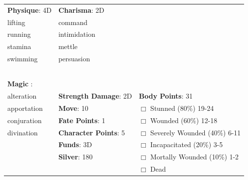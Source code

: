 \documentclass[10pt]{article}
\begin{document}
\begin{table}
\begin{tabular}{m{156pt} m{156pt} m{156pt}}
\textbf{Physique}: 4D \hrulefill & \textbf{Charisma}: 2D \hrulefill     &  \hrulefill \\

lifting              \hrulefill & command              \hrulefill &  \hrulefill \\

running              \hrulefill & intimidation         \hrulefill &  \hrulefill \\

stamina              \hrulefill & mettle               \hrulefill &  \hrulefill \\

swimming             \hrulefill & persuasion           \hrulefill &  \hrulefill \\

 \hrulefill &  \hrulefill &  \hrulefill \\

 \hrulefill &  \hrulefill &  \hrulefill \\

 \hrulefill &  \hrulefill &  \hrulefill \\

 \hrulefill &  \hrulefill &  \hrulefill \\

                                  &                                 &                             \\
\textbf{Magic }:  \hrulefill  &                                 &                             \\
alteration           \hrulefill & \textbf{Strength Damage}: 2D \hrulefill                             & \textbf{Body Points}: 31 \hrulefill \\
apportation          \hrulefill                        & \textbf{Move}:             10             \hrulefill    & $\Box$ Stunned \footnotesize{(80\%)} \hfill 19-24 \\
conjuration          \hrulefill                        & \textbf{Fate Points}:      1      \hrulefill    & $\Box$ Wounded \footnotesize{(60\%)} \hfill 12-18 \\
divination           \hrulefill                        & \textbf{Character Points}: 5 \hrulefill    & $\Box$ Severely Wounded \footnotesize{(40\%)} \hfill 6-11 \\
 \hrulefill                        & \textbf{Funds}:            3D            \hrulefill    & $\Box$ Incapacitated \footnotesize{(20\%)} \hfill 3-5 \\
 \hrulefill                        & \textbf{Silver}:           180           \hrulefill    & $\Box$ Mortally Wounded \footnotesize{(10\%)} \hfill 1-2 \\
 \hrulefill                        &  \hrulefill                                                       & $\Box$ Dead   \\
\end{tabular}
\end{table}
\end{document}
